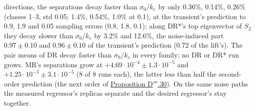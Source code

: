 \begin{sloppypar}
directions, the separations decay faster than $\sigma_0/k_e$ by only 0.36\%, 0.14\%, 0.26\% (classes 1--3, std 0.05;
1.4\%, 0.54\%, 1.0\% at 0.1), at the transient's prediction to 0.9, 1.9 and 0.05 sampling errors (0.8, 1.8, 0.1);
along DR*'s top eigenvector of $S_2$ they decay slower than $\sigma_0/k_e$ by 3.2\% and 12.6\%, the noise-induced part
$0.97\pm0.10$ and $0.96\pm0.10$ of the transient's prediction (0.72 of the lift's). The pair means of DR decay faster
than $\sigma_0/k_e$ in every family; no DR or DR* run grows. MR's separations grow at
$+4.69\cdot10^{-4}\pm1.3\cdot10^{-5}$ and $+1.25\cdot10^{-3}\pm3.1\cdot10^{-5}$ (8 of 8 runs each), the latter less
than half the second-order prediction (the next order of \hyperref[res:thmDppp:30]{Proposition D$'''$.30}). On the
same noise paths the measured regressor's replicas separate and the desired regressor's stay together.
\end{sloppypar}


